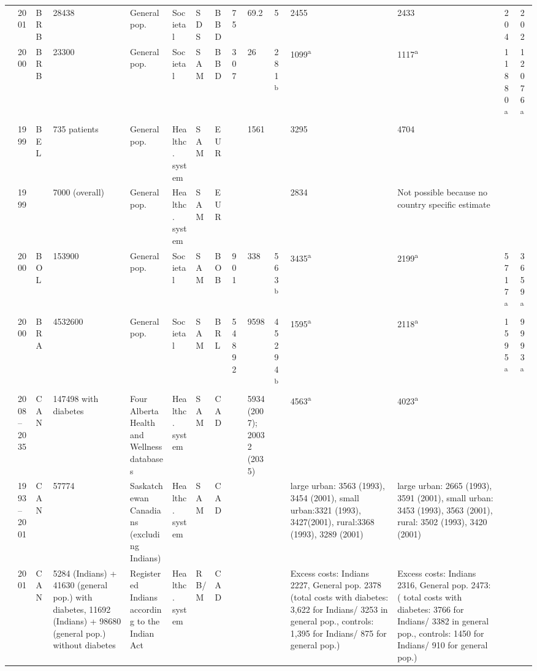 {\begin{landscape}
\begin{tabularx}{\linewidth}{Z X X Z Z X X X X X X X X Y Y}
\textcite{Abdulkadri2009b} & 2001 & BRB & 28438 & General pop. & Societal & SDS & BBD & 75 & 69.2 & 5 & 2455 & 2433 & 204 & 202 \\
\textcite{Barcelo2003} & 2000 & BRB & 23300 & General pop. & Societal & SAM & BBD & 307 & 26 & 281\textsuperscript{b} & 1099\textsuperscript{a} & 1117\textsuperscript{a} & 11880\textsuperscript{a} & 12076\textsuperscript{a} \\
\textcite{Jonsson2002b} & 1999 & BEL & 735 patients & General pop. & Healthc. system & SAM & EUR &  & 1561 &  & 3295 & 4704 &  &  \\
\textcite{Jonsson2002b} & 1999 &  & 7000 (overall) & General pop. & Healthc. system & SAM & EUR &  &  &  & 2834 &Not possible because no country specific   estimate &  &  \\
\textcite{Barcelo2003} & 2000 & BOL & 153900 & General pop. & Societal & SAM & BOB & 901 & 338 & 563\textsuperscript{b} & 3435\textsuperscript{a} & 2199\textsuperscript{a} & 5717\textsuperscript{a} & 3659\textsuperscript{a} \\
\textcite{Barcelo2003} & 2000 & BRA & 4532600 & General pop. & Societal & SAM & BRL & 54892 & 9598 & 45294\textsuperscript{b} & 1595\textsuperscript{a} & 2118\textsuperscript{a} & 1595\textsuperscript{a} & 9993\textsuperscript{a} \\
\textcite{Lau2011a} & 2008--2035 & CAN & 147498 with diabetes & Four Alberta Health and Wellness databases & Healthc. system & SAM & CAD &  & 5934 (2007); 20032 (2035) &  & 4563\textsuperscript{a} & 4023\textsuperscript{a} &  &  \\
\textcite{Pohar2007} & 1993--2001 & CAN & 57774 & Saskatchewan Canadians (excluding Indians) & Healthc. system & SAM & CAD &  &  &  & large urban: 3563 (1993), 3454 (2001), small  urban:3321 (1993), 3427(2001), rural:3368 (1993), 3289 (2001) & large urban: 2665 (1993), 3591 (2001),   small urban: 3453 (1993), 3563 (2001), rural: 3502 (1993), 3420 (2001) &  &  \\
\textcite{Pohar2007a} & 2001 & CAN & 5284 (Indians) + 41630 (general pop.) with  diabetes, 11692 (Indians) + 98680 (general pop.) without diabetes & Registered Indians according to the Indian   Act & Healthc. system & RB/M & CAD &  &  &  & Excess costs: Indians 2227, General pop.   2378 (total costs with diabetes: 3,622 for Indians/ 3253 in general pop.,   controls: 1,395 for Indians/ 875 for general pop.) & Excess costs: Indians 2316, General pop.   2473: ( total costs with diabetes: 3766 for Indians/ 3382 in general pop.,   controls: 1450 for Indians/ 910 for general pop.) &  &  \\

\end{tabularx}
\end{landscape}}
